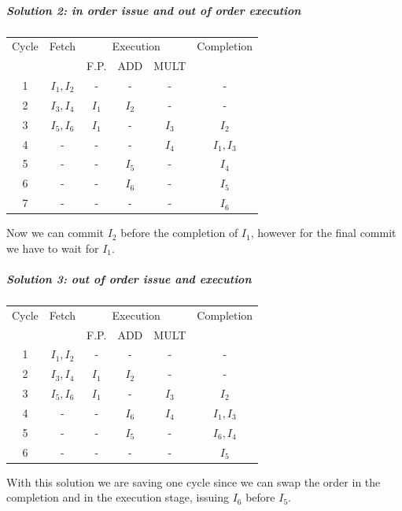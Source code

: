 \subparagraph{Solution 2: in order issue and out of order execution}
\begin{center}
  \begin{tabular}{|c|c|c|c|c|c|}
    \hline
    Cycle&    Fetch       &\multicolumn{3}{|c|}{Execution}  &   Completion  \\
    &       &     F.P.  & ADD     & MULT  &               \\ \hline \hline
    1&    $I_1, I_2$&       -&    -&    -&      -\\
    2&    $I_3, I_4$&       $I_1$&  $I_2$&  -&      -\\
    3&    $I_5, I_6$&       $I_1$&  -&    $I_3$&      $I_2$\\
    4&      -&          -&    -&    $I_4$&      $I_1,I_3$\\
    5&      -&          -&    $I_5$&    -&      $I_4$\\
    6&      -&          -&    $I_6$&    -&      $I_5$\\
    7&      -&          -&    -&      -&      $I_6$\\
    \hline
  \end{tabular}
\end{center}
Now we can commit $I_2$ before the completion of $I_1$, however for the final
commit we have to wait for $I_1$.

\subparagraph{Solution 3: out of order issue and execution}
\begin{center}
\begin{tabular}{|c|c|c|c|c|c|}
  \hline
  Cycle&    Fetch       &\multicolumn{3}{|c|}{Execution}  &   Completion  \\
  &       &     F.P.  & ADD     & MULT  &               \\ \hline \hline
  1&    $I_1, I_2$&    -    & -   & - &         -     \\
  2&    $I_3,I_4$&        $I_1$&  $I_2$&  -&            -     \\
  3&    $I_5,I_6$&        $I_1$&  -&    $I_3$&          $I_2$   \\
  4&      -&          -&    $I_6$&  $I_4$&          $I_1, I_3$  \\
  5&      -&          -&    $I_5$&  -&            $I_6, I_4$  \\
  6&      -&          -&    -&    -&            $I_5$   \\
  \hline
\end{tabular}
\end{center}
With this solution we are saving one cycle since we can swap the order in the
completion and in the execution stage, issuing $I_6$ before $I_5$.


